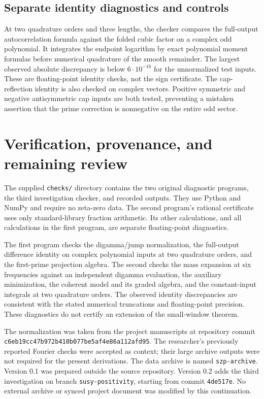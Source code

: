 \documentclass[11pt]{article}
\numberwithin{equation}{section}
\theoremstyle{definition}
\theoremstyle{remark}
\begin{document}
\subsection{Separate identity diagnostics and controls}

At two quadrature orders and three lengths, the checker compares the
full-output autocorrelation formula against the folded cubic factor on a
complex odd polynomial. It integrates the endpoint logarithm by exact
polynomial moment formulas before numerical quadrature of the smooth
remainder. The largest observed absolute discrepancy is below $6\cdot10^{-16}$
for the unnormalized test inputs. These are floating-point identity checks,
not the sign certificate. The cap-reflection identity is also checked on
complex vectors. Positive symmetric and negative antisymmetric cap inputs
are both tested, preventing a mistaken assertion that the prime correction
is nonnegative on the entire odd sector.

\section{Verification, provenance, and remaining review}
\label{app:verification}

The supplied \texttt{checks/} directory contains the two original
diagnostic programs, the third investigation checker, and recorded outputs. They use Python and
NumPy and require no zeta-zero data. The second program's rational
certificate uses only standard-library fraction arithmetic. Its other
calculations, and all calculations in the first program, are separate
floating-point diagnostics.

The first program checks the digamma/jump normalization, the full-output
difference identity on complex polynomial inputs at two quadrature
orders, and the first-prime projection algebra. The second checks the
mass expansion at six frequencies against an independent digamma
evaluation, the auxiliary minimization, the coherent model and its
graded algebra, and the constant-input integrals at two quadrature
orders. The observed identity discrepancies are consistent with the
stated numerical truncations and floating-point precision. These
diagnostics do not certify an extension of the small-window theorem.

The normalization was taken from the project manuscripts
\cite{BakerFirst,BakerWeil} at repository commit
\texttt{c6eb19cc47b972b410b077be5af4e86a112afd95}.
The researcher's previously reported Fourier checks were accepted as
context; their large archive outputs were not required for the present
derivations. The data archive is named \texttt{szp-archive}.
Version 0.1 was prepared outside the source repository. Version 0.2 adds
the third investigation on branch \texttt{susy-positivity}, starting from
commit \texttt{4de517e}. No external archive or synced project document was
modified by this continuation.
\end{document}

